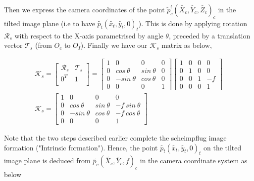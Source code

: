 \documentclass[12pt]{article}
\begin{document}

Then we express the camera coordinates of the point $\tilde{p}_{c}^t(\tilde{X_c},\tilde{Y_c},\tilde{Z_c})_c$   in the tilted image plane (i.e to have $\tilde{p_t} (\tilde{x_{t}},\tilde{y_{t}},0)_t$). This is done by applying rotation $\mathcal{R}_{s}$ with respect to the X-axis parametrised by angle $\theta$, preceded by a translation vector $\mathcal{T}_{s}$  (from $O_c$ to $O_I$). Finally we have our  $\mathcal{K}_{s}$ matrix as below,


\begin{equation}  
\begin{split}  
\mathcal{K}_{s} = \begin{bmatrix}
\mathcal{R}_{s} & \mathcal{T}_{s}\\
0^{T} & 1\\
\end{bmatrix}  =\begin{bmatrix}
1& 0 & 0&0 \\
0 & cos~\theta  & sin~\theta &0 \\
0 & -sin~\theta & cos~\theta&0\\
0 & 0 & 0 & 1
\end{bmatrix} \begin{bmatrix}
1 & 0 & 0&0 \\
0 & 1 & 0&0 \\
0 & 0 & 1&-f \\
0 & 0 & 0 & 1 
\end{bmatrix} \\
\mathcal{K}_s=\begin{bmatrix}
1& 0 & 0&0 \\
0 & cos~\theta  & sin~\theta &-f~sin~\theta \\
0 & -sin~\theta & cos~\theta&-f~cos~\theta\\
0 & 0 & 0 & 1
\end{bmatrix}
\end{split}  
\label{eqn:Ad1}
\end{equation}  


Note that the two steps described earlier complete the scheimpflug image formation ("Intrinsic formation"). Hence, the point $\tilde{p_t}(\tilde{x_t},\tilde{y_t},0)_t$ on the tilted image plane is deduced from $\tilde{p_{c}} (\tilde{X_c},\tilde{Y_c},f)_c$ in the camera coordinate system as below
\end{document}
